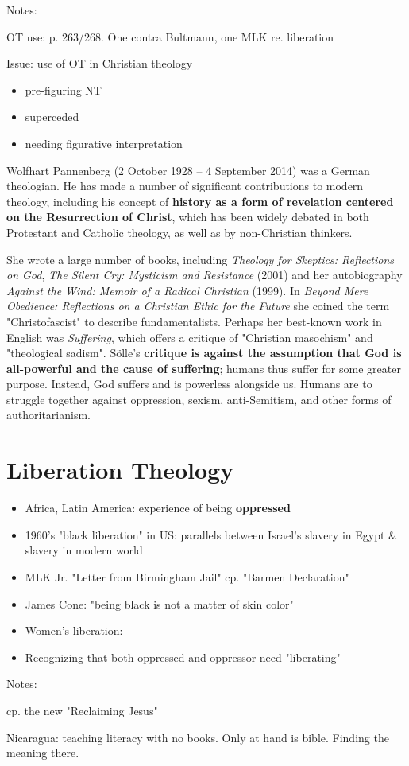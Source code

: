 \documentclass[11pt]{article}
\begin{document}
\begin{NOTES}


Notes:

OT use: p. 263/268. One contra Bultmann, one MLK re. liberation

Issue: use of OT in Christian theology

\begin{itemize}
\item pre-figuring NT
\item superceded
\item needing figurative interpretation
\end{itemize}

Wolfhart Pannenberg (2 October 1928 -- 4 September 2014) was a German theologian. He has made a number of significant contributions to modern theology, including his concept of \textbf{history as a form of revelation centered on the Resurrection of Christ}, which has been widely debated in both Protestant and Catholic theology, as well as by non-Christian thinkers.

She wrote a large number of books, including \emph{Theology for Skeptics: Reflections on God}, \emph{The Silent Cry: Mysticism and Resistance} (2001) and her autobiography \emph{Against the Wind: Memoir of a Radical Christian} (1999). In \emph{Beyond Mere Obedience: Reflections on a Christian Ethic for the Future} she coined the term "Christofascist" to describe fundamentalists. Perhaps her best-known work in English was \emph{Suffering}, which offers a critique of "Christian masochism" and "theological sadism". Sölle's \textbf{critique is against the assumption that God is all-powerful and the cause of suffering}; humans thus suffer for some greater purpose. Instead, God suffers and is powerless alongside us. Humans are to struggle together against oppression, sexism, anti-Semitism, and other forms of authoritarianism.
\end{NOTES}
\section*{Liberation Theology}
\label{liberation-theology}
\begin{itemize}
\item Africa, Latin America: experience of being \textbf{oppressed}
\item 1960's "black liberation" in US: parallels between Israel's slavery in Egypt \& slavery in modern world
\item MLK Jr. "Letter from Birmingham Jail" cp. "Barmen Declaration"
\item James Cone: "being black is not a matter of skin color"
\item Women's liberation:
\item Recognizing that both oppressed and oppressor need "liberating"
\end{itemize}
\begin{NOTES}


Notes:

cp. the new "Reclaiming Jesus"

Nicaragua: teaching literacy with no books. Only at hand is bible.
Finding the meaning there.
\end{NOTES}
\end{document}
